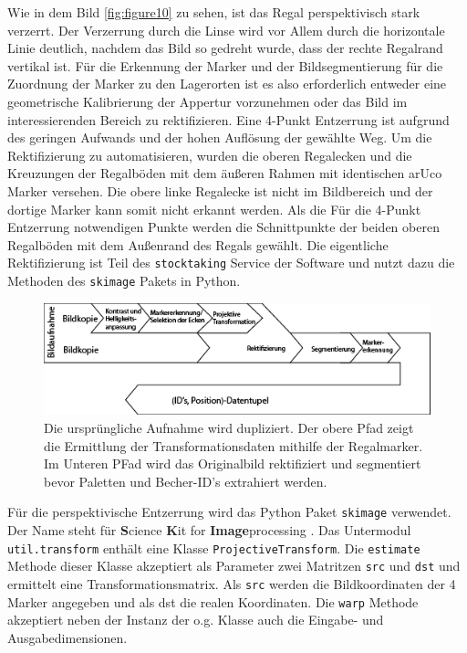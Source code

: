     Wie in dem Bild \ref{fig:figure10} zu sehen, ist das Regal perspektivisch stark verzerrt.
    Der Verzerrung durch die Linse wird vor Allem durch die horizontale Linie deutlich, nachdem das Bild so gedreht wurde, dass der rechte Regalrand vertikal ist. 
    Für die Erkennung der Marker und der Bildsegmentierung für die Zuordnung der Marker zu den Lagerorten ist es also erforderlich entweder eine geometrische Kalibrierung der Appertur vorzunehmen oder das Bild im interessierenden Bereich zu rektifizieren. 
    Eine 4-Punkt Entzerrung ist aufgrund des geringen Aufwands und der hohen Auflösung der gewählte Weg. 
    Um die Rektifizierung zu automatisieren, wurden die oberen Regalecken und die Kreuzungen der Regalböden mit dem äußeren Rahmen mit identischen arUco Marker versehen. 
    Die obere linke Regalecke ist nicht im Bildbereich und der dortige Marker kann somit nicht erkannt werden. 
    Als die Für die 4-Punkt Entzerrung notwendigen Punkte werden die Schnittpunkte der beiden oberen Regalböden mit dem Außenrand des Regals gewählt. 
    Die eigentliche Rektifizierung ist Teil des \verb|stocktaking| Service der Software und nutzt dazu die Methoden des \verb|skimage| Pakets in Python.

    \begin{figure}
        \caption[Ablauf Bildverarbeitung und Markererkennung der Übersichtskamera]
        {\small Die ursprüngliche Aufnahme wird dupliziert. Der obere Pfad zeigt die Ermittlung der Transformationsdaten mithilfe der Regalmarker. Im Unteren PFad wird das Originalbild rektifiziert und segmentiert bevor Paletten und Becher-ID's extrahiert werden.}\label{fig:figure11}
        \includegraphics[width = \textwidth ]{Bilder/AblaufErkennungSellCam.png}
        \centering
    \end{figure}

    Für die perspektivische Entzerrung wird das Python Paket \verb|skimage| verwendet. Der Name steht für \glq \textbf{S}cience \textbf{K}it for \textbf{Image}processing \grq.
    Das Untermodul \verb|util.transform| enthält eine Klasse \verb|ProjectiveTransform|. Die \verb|estimate| Methode dieser Klasse akzeptiert als Parameter zwei Matritzen \verb|src| und \verb|dst| und ermittelt eine Transformationsmatrix.
    Als \verb|src| werden die Bildkoordinaten der 4 Marker angegeben und als dst die \glq realen \grq Koordinaten.
    Die \verb|warp| Methode akzeptiert neben der Instanz der o.g. Klasse auch die Eingabe- und Ausgabedimensionen. 

